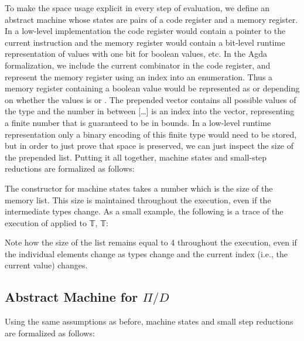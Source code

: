 \documentclass[sigplan,10pt,review,anonymous]{acmart}
\begin{document}
\PIMEMcardeq{}

To make the space usage explicit in every step of evaluation, we
define an abstract machine whose states are pairs of a code register
and a memory register. In a low-level implementation the code register
would contain a pointer to the current instruction and the memory
register would contain a bit-level runtime representation of values
with one bit for boolean values, etc. In the Agda formalization, we
include the current combinator in the code register, and represent the
memory register using an index into an enumeration. Thus a memory
register containing a boolean value would be represented as
\AgdaFunction{[𝔽 ,  𝕋 ][0]} or \AgdaFunction{[𝔽 ,  𝕋 ][1]} depending on whether the
values is  or .
The prepended vector
contains all possible values of the type and the number in between [\ldots ]
is an index into the vector, representing a finite number that
is guaranteed to be in bounds. In a low-level runtime representation
only a binary encoding of this finite type would need to be stored, but in
order to just prove that space is preserved, we can just inspect the
size of the prepended list. Putting it all together, machine states and
small-step reductions are formalized as follows:

\PIMEMstep{}

The constructor for machine states takes a number which is the size of
the memory list. This size is maintained throughout the execution,
even if the intermediate types change. As a small example, the
following is a trace of the execution of  applied
to 𝕋, 𝕋:
{\center}

Note how the size of the list remains equal to 4 throughout the
execution, even if the individual elements change as types change and
the current index (i.e., the current value) changes.


\subsection{Abstract Machine for $\Pi/D$}

Using the same assumptions as before, machine states and small step
reductions are formalized as follows:
\end{document}
